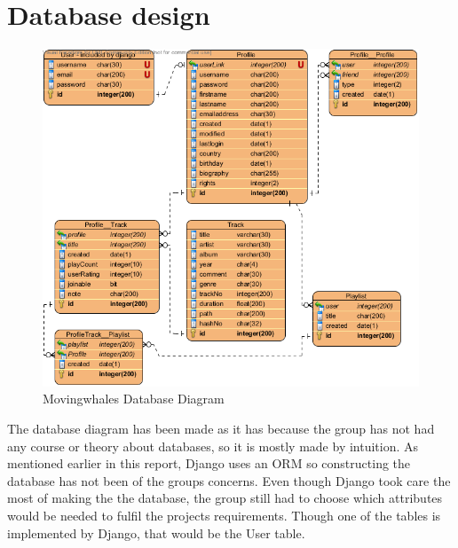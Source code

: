 \section{Database design}
\begin{figure}[h!]
\centering
\includegraphics[scale=0.5]{design/figures/mwdbdiagram}
\caption{Movingwhales Database Diagram}
\end{figure}
The database diagram has been made as it has because the group has not had any course or theory about databases, so it is mostly made by intuition. As mentioned earlier in this report, Django uses an ORM so constructing the database has not been of the groups concerns. Even though Django took care the most of making the the database, the group still had to choose which attributes would be needed to fulfil the projects requirements. Though one of the tables is implemented by Django, that would be the User table.  